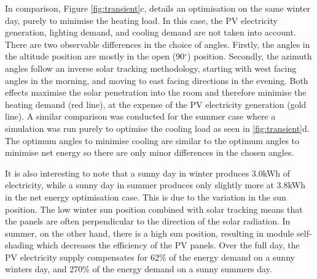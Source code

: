 In comparison, Figure \ref{fig:transient}c, details an optimisation on the same winter day, purely to minimise the heating load. In this case, the PV electricity generation, lighting demand, and cooling demand are not taken into account. There are two observable differences in the choice of angles. Firstly, the angles in the altitude position are mostly in the open (90$^{\circ}$) position. Secondly, the azimuth angles follow an inverse solar tracking methodology, starting with west facing angles in the morning, and moving to east facing directions in the evening. Both effects maximise the solar penetration into the room and therefore minimise the heating demand (red line), at the expense of the PV electricity generation (gold line). A similar comparison was conducted for the summer case where a simulation was run purely to optimise the cooling load as seen in \ref{fig:transient}d. The optimum angles to minimise cooling are similar to the optimum angles to minimise net energy so there are only minor differences in the chosen angles.

It is also interesting to note that a sunny day in winter produces 3.0kWh of electricity, while a sunny day in summer produces only slightly more at 3.8kWh in the net energy optimisation case. This is due to the variation in the sun position. The  low winter sun position combined with solar tracking means that the panels are often perpendicular to the direction of the solar radiation. In summer, on the other hand, there is a high sun position, resulting in module self-shading which decreases the efficiency of the PV panels. Over the full day, the PV electricity supply compensates for 62\% of the energy demand on a sunny winters day, and 270\% of the energy demand on a sunny summers day. 



